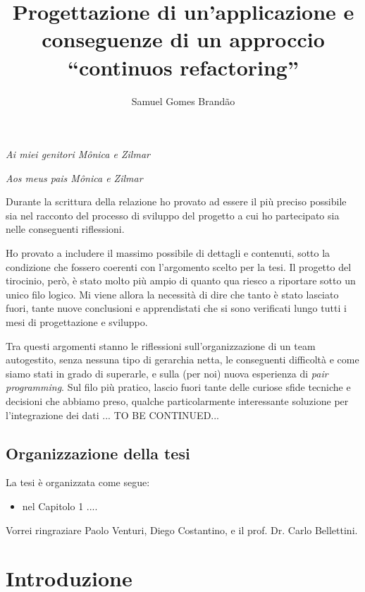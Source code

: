 \documentclass[12pt]{report}
\begin{document}
\title{Progettazione di un'applicazione e conseguenze di un approccio ``continuos refactoring''}
\author{Samuel Gomes Brandão}

\beforepreface
{}
        {\hfill \Large {\sl Ai miei genitori Mônica e Zilmar}}

        {\hfill \Large {\sl Aos meus pais Mônica e Zilmar}}
% 
%

Durante la scrittura della relazione ho provato ad essere il più preciso possibile sia nel racconto del processo di sviluppo del progetto a cui ho partecipato sia nelle conseguenti riflessioni.

Ho provato a includere il massimo possibile di dettagli e contenuti, sotto la condizione che fossero coerenti con l'argomento scelto per la tesi. Il progetto del tirocinio, però, è stato molto più ampio di quanto qua riesco a riportare sotto un unico filo logico. Mi viene allora la necessità di dire che tanto è stato lasciato fuori, tante nuove conclusioni e apprendistati che si sono verificati lungo tutti i mesi di progettazione e sviluppo.

Tra questi argomenti stanno le riflessioni sull'organizzazione di un team autogestito, senza nessuna tipo di gerarchia netta, le conseguenti difficoltà e come siamo stati in grado di superarle, e sulla (per noi) nuova esperienza di \textit{pair programming}. Sul filo più pratico, lascio fuori tante delle curiose sfide tecniche e decisioni che abbiamo preso, qualche particolarmente interessante soluzione per l'integrazione dei dati ... TO BE CONTINUED...
%
%
\section*{Organizzazione della tesi}
\label{organizzazione}
La tesi \`e organizzata come segue:
\begin{itemize}
\item nel Capitolo 1 ....
\end{itemize}
%
%
Vorrei ringraziare Paolo Venturi, Diego Costantino, 
e il prof. Dr. Carlo Bellettini. 
\afterpreface


% 
% 
\chapter{Introduzione}
\label{cap1}
\end{document}
